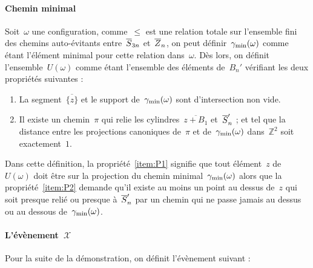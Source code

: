 		\paragraph{Chemin minimal}
			Soit~$\omega$ une configuration, comme~$\leq$ est une relation totale sur l'ensemble fini des chemins auto-évitants entre~$\SnB$ et~$\ZnB$, on peut définir~$\Cmin$ \marginnote{$\Cmin$} comme étant l'élément minimal pour cette relation dans~$\omega$. Dès lors, on définit l'ensemble~$U(\omega)$  comme étant l'ensemble des éléments de~$B_n'$ vérifiant les deux propriétés suivantes :
			\begin{enumerate}[label=\textbf{P\arabic*}., ref=P\arabic*]
				\item\label{item:P1} La segment~$\overline{\{z\}}$ et le support de~$\Cmin$ sont d'intersection non vide.
				\item\label{item:P2} Il existe un chemin~$\pi$ qui relie les cylindres~$\overline{z+B_1}$ et~$\SnB[n]'$ ; et tel que la distance entre les projections canoniques de~$\pi$ et de~$\Cmin$ dans~$\mathbb{Z}^2$ soit exactement~$1$.
			\end{enumerate}
			Dans cette définition, la propriété~\ref{item:P1} signifie que tout élément~$z$ de~$U(\omega)$ doit être sur la projection du chemin minimal~$\Cmin$ alors que la propriété~\ref{item:P2} demande qu'il existe au moins un point au dessus de~$z$ qui soit presque relié ou presque à~$\SnB[n]'$ par un chemin qui ne passe jamais au dessus ou au dessous de~$\Cmin$.
		
		\boldmath
		\paragraph{L'évènement~$\mathcal{X}$}
		\unboldmath
		Pour la suite de la démonstration, on définit l'évènement suivant :
		
